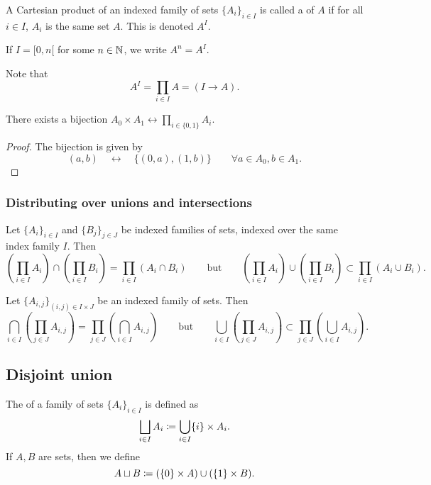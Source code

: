 \begin{definition}
A Cartesian product of an indexed family of sets $\{A_i\}_{i\in I}$ is called a  of $A$ if for all $i\in I$, $A_i$ is the same set $A$. This is denoted $A^I$.
\end{definition}
If $I = [0,n[$ for some $n\in \mathbb{N}$, we write $A^n = A^I$.

Note that
\[ A^I = \prod_{i\in I} A = (I\to A).  \]

\begin{lemma}
There exists a bijection $A_0\times A_1 \leftrightarrow \prod_{i\in\{0,1\}} A_i$.
\end{lemma}
\begin{proof}
The bijection is given by
\[ (a,b) \quad\leftrightarrow\quad \{(0,a),(1,b)\} \qquad \forall a\in A_0, b\in A_1. \]
\end{proof}

\subsubsection{Distributing over unions and intersections}
\begin{lemma}
Let $\{A_{i}\}_{i \in I}$ and $\{B_{j}\}_{j \in J}$ be indexed families of sets, indexed over the same index family $I$. Then
\[ \left(\prod_{i\in I}A_i\right)\cap\left(\prod_{i\in I}B_i\right) = \prod_{i\in I}(A_i\cap B_i) \qquad\text{but}\qquad \left(\prod_{i\in I}A_i\right)\cup\left(\prod_{i\in I}B_i\right) \subset \prod_{i\in I}(A_i\cup B_i). \]
\end{lemma}

\begin{lemma}
Let $\{A_{i,j}\}_{(i,j) \in I\times J}$ be an indexed family of sets. Then
\[ \bigcap_{i\in I}\left(\prod_{j\in J}A_{i,j}\right) = \prod_{j\in J}\left(\bigcap_{i\in I}A_{i,j}\right) \qquad\text{but}\qquad \bigcup_{i\in I}\left(\prod_{j\in J}A_{i,j}\right) \subset \prod_{j\in J}\left(\bigcup_{i\in I}A_{i,j}\right). \]
\end{lemma}

\subsection{Disjoint union}
\begin{definition}
The  of a family of sets $\{A_i\}_{i\in I}$ is defined as
\[ \bigsqcup_{i\in I}A_i \coloneqq \bigcup_{i\in I}\{i\}\times A_i. \]
If $A,B$ are sets, then we define
\[ A\sqcup B \coloneqq (\{0\}\times A)\cup (\{1\}\times B). \]
\end{definition}

